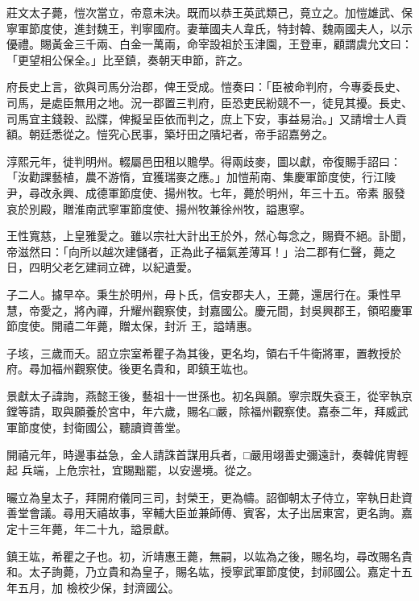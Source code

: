 \begin{pinyinscope}
 莊文太子薨，愷次當立，帝意未決。既而以恭王英武類己，竟立之。加愷雄武、保寧軍節度使，進封魏王，判寧國府。妻華國夫人韋氏，特封韓、魏兩國夫人，以示優禮。賜黃金三千兩、白金一萬兩，命宰設祖於玉津園，王登車，顧謂虞允文曰：「更望相公保全。」比至鎮，奏朝天申節，許之。



 府長史上言，欲與司馬分治郡，俾王受成。愷奏曰：「臣被命判府，今專委長史、
 司馬，是處臣無用之地。況一郡置三判府，臣恐吏民紛競不一，徒見其擾。長史、司馬宜主錢穀、訟牒，俾擬呈臣依而判之，庶上下安，事益易治。」又請增士人貢額。朝廷悉從之。愷究心民事，築圩田之隤圮者，帝手詔嘉勞之。



 淳熙元年，徙判明州。輟屬邑田租以贍學。得兩歧麥，圖以獻，帝復賜手詔曰：「汝勸課藝植，農不游惰，宜獲瑞麥之應。」加愷荊南、集慶軍節度使，行江陵尹，尋改永興、成德軍節度使、揚州牧。七年，薨於明州，年三十五。帝素
 服發哀於別殿，贈淮南武寧軍節度使、揚州牧兼徐州牧，謚惠寧。



 王性寬慈，上皇雅愛之。雖以宗社大計出王於外，然心每念之，賜賚不絕。訃聞，帝滋然曰：「向所以越次建儲者，正為此子福氣差薄耳！」治二郡有仁聲，薨之日，四明父老乞建祠立碑，以紀遺愛。



 子二人。攄早卒。秉生於明州，母卜氏，信安郡夫人，王薨，還居行在。秉性早慧，帝愛之，將內禪，升耀州觀察使，封嘉國公。慶元間，封吳興郡王，領昭慶軍節度使。開禧二年薨，贈太保，封沂
 王，謚靖惠。



 子垓，三歲而夭。詔立宗室希瞿子為其後，更名均，領右千牛衛將軍，置教授於府。尋加福州觀察使。後更名貴和，即鎮王竑也。



 景獻太子諱詢，燕懿王後，藝祖十一世孫也。初名與願。寧宗既失袞王，從宰執京鏜等請，取與願養於宮中，年六歲，賜名□嚴，除福州觀察使。嘉泰二年，拜威武軍節度使，封衛國公，聽讀資善堂。



 開禧元年，時邊事益急，金人請誅首謀用兵者，□嚴用翊善史彌遠計，奏韓侂冑輕起
 兵端，上危宗社，宜賜黜罷，以安邊境。從之。



 曮立為皇太子，拜開府儀同三司，封榮王，更為幬。詔御朝太子侍立，宰執日赴資善堂會議。尋用天禧故事，宰輔大臣並兼師傅、賓客，太子出居東宮，更名詢。嘉定十三年薨，年二十九，謚景獻。



 鎮王竑，希瞿之子也。初，沂靖惠王薨，無嗣，以竑為之後，賜名均，尋改賜名貴和。太子詢薨，乃立貴和為皇子，賜名竑，授寧武軍節度使，封祁國公。嘉定十五年五月，加
 檢校少保，封濟國公。




\end{pinyinscope}
